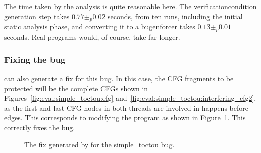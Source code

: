 The time taken by the analysis is quite reasonable here.  The
\gls{verificationcondition} generation step takes $0.77 \pm_p 0.02$
seconds, from ten runs, including the initial static analysis phase,
and converting it to a \gls{bugenforcer} takes $0.13 \pm_p 0.01$
seconds.  Real programs would, of course, take far longer.

\subsubsection{Fixing the bug}
{\Implementation} can also generate a fix for this bug.  In this case,
the CFG fragments to be protected will be the complete CFGs shown in
Figures~\ref{fig:eval:simple_toctou:cfg}
and~\ref{fig:eval:simple_toctou:interfering_cfg2}, as the first and
last CFG nodes in both threads are involved in happens-before edges.
This corresponds to modifying the program as shown in
Figure~\ref{fig:eval:simple_toctou:fix}.  This correctly fixes the
bug.

\begin{figure}
  \centerline{
    {\hfill}
  {\hfill}
  \hfill
  }
  \caption{The fix generated by {\implementation} for the simple\_toctou bug.}
  \label{fig:eval:simple_toctou:fix}
\end{figure}

